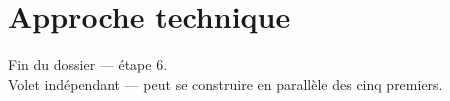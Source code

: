 \documentclass[11pt,a4paper,oneside]{report}
\begin{document}


\part{Approche technique}



\vfill
\begin{center}\small\color{AlanyaGray}\sffamily
Fin du dossier --- étape 6. \\
Volet indépendant --- peut se construire en parallèle des cinq premiers.
\end{center}
\end{document}
